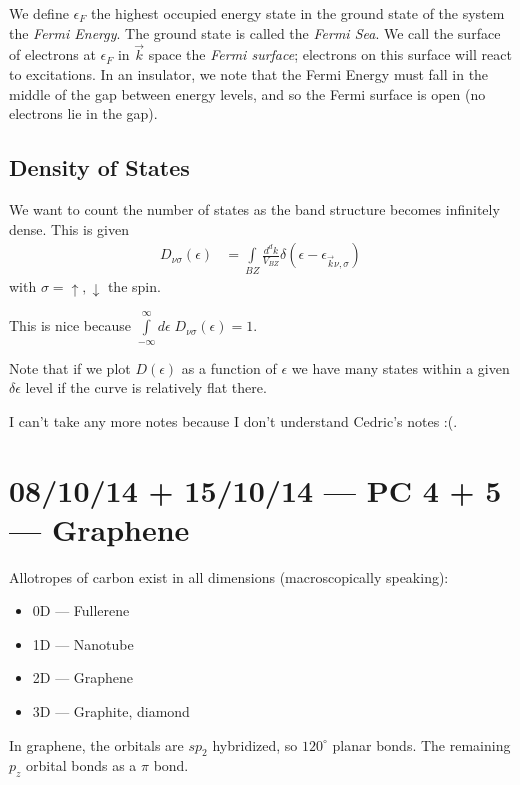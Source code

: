 \documentclass[10pt]{report}
\begin{document}
We define $\epsilon_F$ the highest occupied energy state in the ground state of the system the \emph{Fermi Energy}. The ground state is called the \emph{Fermi Sea}. We call the surface of electrons at $\epsilon_F$ in $\vec{k}$ space the \emph{Fermi surface}; electrons on this surface will react to excitations. In an insulator, we note that the Fermi Energy must fall in the middle of the gap between energy levels, and so the Fermi surface is open (no electrons lie in the gap). 

\section{Density of States}

We want to count the number of states as the band structure becomes infinitely dense. This is given
\begin{align}
    D_{\nu\sigma}(\epsilon) &= \int\limits_{BZ}^{}\frac{d^dk}{V_{BZ}}\delta\left( \epsilon - \epsilon_{\vec{k}\nu,\sigma} \right)
\end{align}
with $\sigma = \uparrow, \downarrow$ the spin.

This is nice because $\int\limits_{-\infty}^{\infty}d\epsilon\;D_{\nu\sigma}(\epsilon) = 1$.

Note that if we plot $D(\epsilon)$ as a function of $\epsilon$ we have many states within a given $\delta \epsilon$ level if the curve is relatively flat there.

I can't take any more notes because I don't understand Cedric's notes :(.

\chapter{08/10/14 + 15/10/14 --- PC 4 + 5 --- Graphene}

Allotropes of carbon exist in all dimensions (macroscopically speaking):
\begin{itemize}
    \item 0D --- Fullerene
    \item 1D --- Nanotube
    \item 2D --- Graphene
    \item 3D --- Graphite, diamond
\end{itemize}

In graphene, the orbitals are $sp_2$ hybridized, so $120^\circ$ planar bonds. The remaining $p_z$ orbital bonds as a $\pi$ bond.
\end{document}
